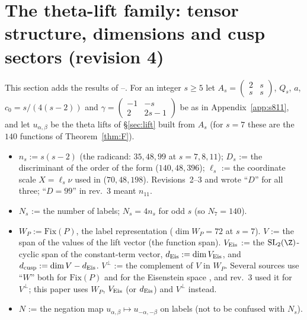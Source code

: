 \section{The theta-lift family: tensor structure, dimensions and cusp sectors (revision 4)}\label{sec:family}
This section adds the results of --. For an integer $s\ge5$ let $A_s=\begin{pmatrix}2&s\\s&s\end{pmatrix}$, $Q_s$, $a$, $c_0=s/(4(s-2))$ and
$\gamma=\begin{pmatrix}-1&-s\\2&2s-1\end{pmatrix}$ be as in Appendix~\ref{app:s811}, and let $u_{\alpha,\beta}$ be the theta lifts of \S\ref{sec:lift} built from $A_s$
(for $s=7$ these are the $140$ functions of Theorem~\ref{thm:F}).

\begin{remark}\label{rem:notation}
\begin{itemize}[leftmargin=2em]
\item $n_s:=s(s-2)$ (the radicand: $35,48,99$ at $s=7,8,11$); $D_s$ := the discriminant of the order of the form ($140,48,396$); $\ell_s$ := the coordinate
scale $X=\ell_s\nu$ used in  ($70,48,198$). Revisions~2--3 and  wrote ``$D$'' for all three; ``$D=99$'' in rev.~3 meant $n_{11}$.
\item $N_s$ := the number of labels; $N_s=4n_s$ for odd $s$ (so $N_7=140$).
\item $W_P:=\mathrm{Fix}(P)$, the label representation ($\dim W_P=72$ at $s=7$). $V$ := the span of the values of the lift vector (the function span).
$V_{\rm Eis}$ := the $\mathrm{SL}_2(\Z)$-cyclic span of the constant-term vector, $d_{\rm Eis}:=\dim V_{\rm Eis}$, and $d_{\rm cusp}:=\dim V-d_{\rm Eis}$.
$V^\perp$ := the complement of $V$ in $W_P$. Several sources use ``$W$'' both for $\mathrm{Fix}(P)$  and for the Eisenstein space ,
and rev.~3 used it for $V^\perp$; this paper uses $W_P$, $V_{\rm Eis}$ (or $d_{\rm Eis}$) and $V^\perp$ instead.
\item $N$ := the negation map $u_{\alpha,\beta}\mapsto u_{-\alpha,-\beta}$ on labels (not to be confused with $N_s$).
\end{itemize}
\end{remark}

